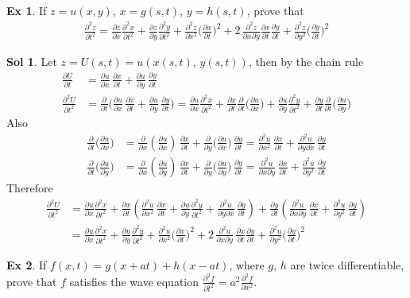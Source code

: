 \documentclass[12pt]{extarticle}
\newcommand{\ds}{\displaystyle}
\theoremstyle{definition}
\newtheorem*{ex}{Ex}
\newtheorem*{sol}{Sol}
\newcommand{\pdiff}[2]{\frac{\partial #1}{\partial #2}}
\newcommand{\pdifft}[2]{\frac{\partial^2 #1}{\partial #2^2}}
\begin{document}
\begin{ex}
  If $\ds z = u(x, y)$, $\ds x = g(s, t)$, $\ds y = h(s, t)$, prove that 
  \begin{align*}
    \pdifft{z}{t} = \pdiff{z}{x}\pdifft{x}{t} + \pdiff{z}{y}\pdifft{y}{t} + \pdifft{z}{x}\bigg(\pdiff{x}{t}\bigg)^2 + 2\,\frac{\partial^2 z}{\partial x\partial y}\pdiff{x}{t}\pdiff{y}{t} + \pdifft{z}{y}\bigg(\pdiff{y}{t}\bigg)^2
  \end{align*}
\end{ex}

\begin{sol}
  Let $\ds z = U(s, t) = u(x(s, t),\,y(s, t))$, then by the chain rule 
  \begin{align*}
    \pdiff{U}{t} &= \pdiff{u}{x}\,\pdiff{x}{t} + \pdiff{u}{y}\,\pdiff{y}{t} \\
    \pdifft{U}{t} &= \pdiff{}{t}\bigg(\pdiff{u}{x}\,\pdiff{x}{t} + \pdiff{u}{y}\,\pdiff{y}{t}\bigg) = \pdiff{u}{x}\pdifft{x}{t} + \pdiff{x}{t}\pdiff{}{t}\bigg(\pdiff{u}{x}\bigg) + \pdiff{u}{y}\pdifft{y}{t} + \pdiff{y}{t}\pdiff{}{t}\bigg(\pdiff{u}{y}\bigg) 
  \end{align*}
  Also
  \begin{align*}
    \pdiff{}{t}\bigg(\pdiff{u}{x}\bigg) &= \pdiff{}{x}\left(\pdiff{u}{x}\right)\,\pdiff{x}{t} + \pdiff{}{y}\bigg(\pdiff{u}{x}\bigg)\,\pdiff{y}{t} = \pdifft{u}{x}\,\pdiff{x}{t} + \frac{\partial^2 u}{\partial y\partial x}\,\pdiff{y}{t}\\
    \pdiff{}{t}\bigg(\pdiff{u}{y}\bigg) &= \pdiff{}{x}\left(\pdiff{u}{y}\right)\,\pdiff{x}{t} + \pdiff{}{y}\bigg(\pdiff{u}{y}\bigg)\,\pdiff{y}{t} = \frac{\partial^2 u}{\partial x\partial y}\,\pdiff{x}{t} + \pdifft{u}{y}\,\pdiff{y}{t}
  \end{align*}
  Therefore
  \begin{align*}
    \pdifft{U}{t} &= \pdiff{u}{x}\pdifft{x}{t} + \pdiff{x}{t}\left(\pdifft{u}{x}\,\pdiff{x}{t} + \pdiff{u}{y}\pdifft{y}{t} + \frac{\partial^2 u}{\partial y\partial x}\,\pdiff{y}{t}\right) + \pdiff{y}{t}\left(\frac{\partial^2 u}{\partial x\partial y}\,\pdiff{x}{t} + \pdifft{u}{y}\,\pdiff{y}{t}\right) \\ &= \pdiff{u}{x}\pdifft{x}{t} + \pdiff{u}{y}\pdifft{y}{t} + \pdifft{u}{x}\bigg(\pdiff{x}{t}\bigg)^2 + 2\,\frac{\partial^2 u}{\partial x\partial y}\,\pdiff{x}{t}\pdiff{y}{t} + \pdifft{u}{y}\bigg(\pdiff{y}{t}\bigg)^2
  \end{align*}
\end{sol}

\begin{ex} If $\ds f(x, t) = g(x + at) + h(x - at)$, where $g$, $h$ are twice differentiable, prove that $f$ satisfies the wave equation $\ds\pdifft{f}{t} = a^2\pdifft{f}{x}$. 
\end{ex}
\end{document}

